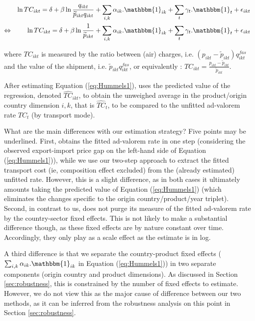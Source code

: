 \documentclass[a4paper,11pt]{article}
\begin{document}
\begin{eqnarray}
&&\ln TC_{ikt} = \delta+ \beta \ln \frac{q_{ikt}}{\widetilde{p}_{ikt}q_{ikt}} + \sum_{i,k}\alpha_{ik}.\mathbbm{1}_{ik}+ \sum_{t}\gamma_{t}.\mathbbm{1}_{t} + \epsilon_{ikt} \notag \\
\Leftrightarrow && \ln TC_{ikt} = \delta+ \beta \ln \frac{1}{\widetilde{p}_{ikt}} + \sum_{i,k}\alpha_{ik}.\mathbbm{1}_{ik}+ \sum_{t}\gamma_{t}.\mathbbm{1}_{t} + \epsilon_{ikt} \label{eq:Hummels1}
\end{eqnarray}

\noindent where $TC_{ikt}$ is measured by the ratio between (air) charges, i.e.
$(p_{ikt} - \widetilde{p}_{ikt})q^{fas}_{ikt}$ and the value of the shipment, i.e.
$\widetilde{p}_{ikt}q^{fas}_{ikt}$, or equivalently : $TC_{ikt} = \frac{p_{ikt} - \widetilde{p}_{ikt}}{\widetilde{p}_{ikt}}$.\medskip

After estimating Equation (\ref{eq:Hummels1}), \cite{hummels2007} uses the predicted value of the regression, denoted $\widehat{TC}_{ikt}$, to obtain the unweighed average in the product/origin country dimension $i,k$, that is $\widehat{TC}_{t}$, to be compared to the unfitted ad-valorem rate $TC_{t}$ (by transport mode).\medskip

What are the main differences with our estimation strategy? Five points may be underlined.
First, \cite{hummels2007} obtains the fitted ad-valorem rate in one step (considering the observed export-import price gap on the left-hand side of Equation (\ref{eq:Hummels1})), while we use our two-step approach to extract the fitted transport cost (ie, composition effect excluded) from the (already estimated) unfitted rate.
However, this is a slight difference, as in both cases it ultimately amounts taking the predicted value of Equation (\ref{eq:Hummels1}) (which eliminates the changes specific to the origin country/product/year triplet).
Second, in contrast to us, \cite{hummels2007} does not purge its measure of the fitted ad-valorem rate by the country-sector fixed effects.
This is not likely to make a substantial difference though, as these fixed effects are by nature constant over time.
Accordingly, they only play as a scale effect as the estimate is in log.

A third difference is that we separate the country-product fixed effects ($\sum_{i,k}\alpha_{ik}.\mathbbm{1}_{ik}$ in Equation (\ref{eq:Hummels1})) in two separate components (origin country and product dimensions).
As discussed in Section \ref{sec:robustness}, this is constrained by the number of fixed effects to estimate.
However, we do not view this as the major cause of difference between our two methods, as it can be inferred from the robustness analysis on this point in Section \ref{sec:robustness}.
\end{document}
